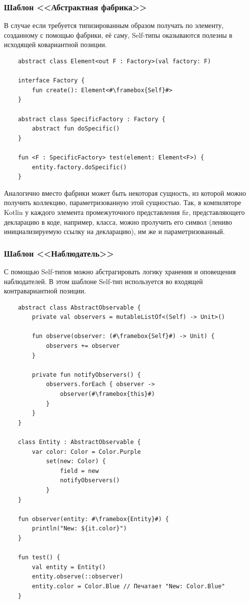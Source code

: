 \subsubsection{Шаблон <<Абстрактная фабрика>>}

В случае если требуется типизированным образом получать по элементу, созданному с помощью фабрики, её саму, Self-типы оказываются полезны в исходящей ковариантной позиции.

\begin{verbatim}
    abstract class Element<out F : Factory>(val factory: F)

    interface Factory {
        fun create(): Element<#\framebox{Self}#>
    }

    abstract class SpecificFactory : Factory {
        abstract fun doSpecific()
    }

    fun <F : SpecificFactory> test(element: Element<F>) {
        entity.factory.doSpecific()
    }
\end{verbatim}

Аналогично вместо фабрики может быть некоторая сущность, из которой можно получить коллекцию, параметризованную этой сущностью.
Так, в компиляторе Kotlin у каждого элемента промежуточного представления fir, представляющего декларацию в коде, например, класса, можно пролучить его символ (лениво инициализируемую ссылку на декларацию), им же и параметризованный.

\subsubsection{Шаблон <<Наблюдатель>>}

С помощью Self-типов можно абстрагировать логику хранения и оповещения наблюдателей.
В этом шаблоне Self-тип используется во входящей контравариантной позиции.

\begin{verbatim}
    abstract class AbstractObservable {
        private val observers = mutableListOf<(Self) -> Unit>()

        fun observe(observer: (#\framebox{Self}#) -> Unit) {
            observers += observer
        }

        private fun notifyObservers() {
            observers.forEach { observer ->
                observer(#\framebox{this}#)
            }
        }
    }

    class Entity : AbstractObservable {
        var color: Color = Color.Purple
            set(new: Color) {
                field = new
                notifyObservers()
            }
    }

    fun observer(entity: #\framebox{Entity}#) {
        println("New: ${it.color}")
    }

    fun test() {
        val entity = Entity()
        entity.observe(::observer)
        entity.color = Color.Blue // Печатает "New: Color.Blue"
    }
\end{verbatim}

